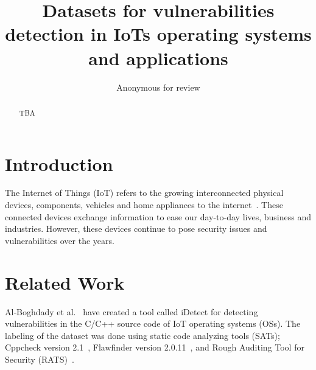 \documentclass[sigconf,screen,balance,natbib=false,timestamp=false,urlbreakonhyphens=true]{acmart}
\begin{document}
%
\title{Datasets for vulnerabilities detection in IoTs operating systems and applications}

\author{
  Anonymous for review
}



\begin{abstract}
  TBA
\end{abstract}


\maketitle

\section{Introduction}

The Internet of Things (IoT) refers to the growing interconnected physical devices,
components, vehicles and home appliances to the internet~\cite{oracle2023:what}.
These connected devices exchange information to ease our day-to-day lives, business and industries.
However, these devices continue to pose security issues and vulnerabilities over the years.



\section{Related Work}

Al‑Boghdady et al.~\cite{al-boghdady2022:idetect} have created a tool called iDetect for detecting
vulnerabilities in the C/C++ source code of IoT operating systems (OSs).
The labeling of the dataset was done using static code analyzing tools (SATs);
Cppcheck version 2.1~\cite{cppcheck2.12021:tool},
Flawfinder version 2.0.11~\cite{dwheeler2021:flawfinder},
and Rough Auditing Tool for Security (RATS)~\cite{rats2021:rough}.
\end{document}
